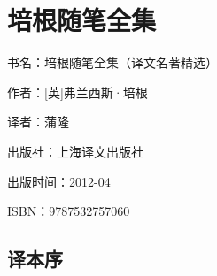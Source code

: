 

\section{培根随笔全集}

\par 书名：培根随笔全集（译文名著精选）
\par 作者：[英]弗兰西斯·培根
\par 译者：蒲隆
\par 出版社：上海译文出版社
\par 出版时间：2012-04
\par ISBN：9787532757060




\subsection*{译本序}

